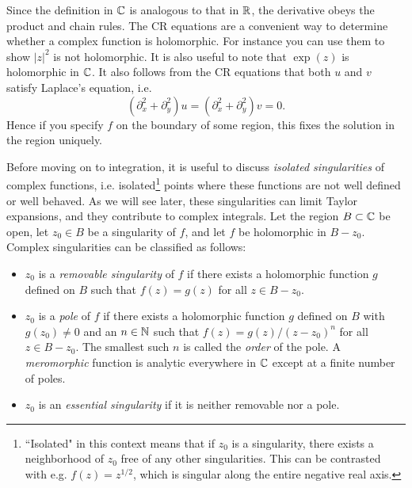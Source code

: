 Since the definition in $\mathbb{C}$ is analogous to that in $\mathbb{R}$, the derivative obeys
the product and chain rules. The CR equations are a convenient way
to determine whether a complex function is holomorphic. For instance you can
use them to show $|z|^2$ is not holomorphic. 
It is also useful to note that $\exp(z)$ is holomorphic in $\mathbb{C}$.
It also follows from the CR equations that both $u$ and $v$ satisfy
Laplace's equation, i.e.
\begin{equation}
\left(\partial_x^2+ \partial_y^2\right)u = \left(\partial_x^2
+\partial_y^2\right)v = 0.
\end{equation}
Hence if you specify $f$ on the boundary of some region, this fixes the solution
in the region uniquely.

Before moving on to integration, it is useful to discuss {\it isolated singularities} of
complex functions, i.e. isolated\footnote{``Isolated" in this context means that if
$z_0$ is a singularity, there exists a neighborhood of $z_0$ free of any other
singularities. This can be contrasted with e.g. $f(z)=z^{1/2}$, which is
singular along the entire negative real axis.} 
points where these functions are not well defined
or well behaved. As we will see later, these singularities can limit Taylor
expansions, and they contribute to complex integrals. 
Let the region $B\subset\mathbb{C}$ be open, let $z_0\in B$ be a singularity of $f$, 
and let $f$ be holomorphic in $B-z_0$. Complex singularities
can be classified as follows:
\begin{itemize}
  \item $z_0$ is a {\it removable singularity} of $f$ if there exists a
        holomorphic function $g$ defined on $B$ such that $f(z) = g(z)$ for all
        $z\in B-z_0$.  
  \item $z_0$ is a {\it pole} of $f$ if there exists a holomorphic function $g$
        defined on $B$ with $g(z_0)\neq0$ and an $n\in\mathbb{N}$ such that 
        $f(z) = g(z) / (z-z_0)^n$ for all $z\in B-z_0$. The smallest such $n$ 
        is called the {\it order} of the pole. A {\it meromorphic} function
         is analytic everywhere in $\mathbb{C}$ except at a finite
        number of poles.
  \item $z_0$ is an {\it essential singularity} if it is neither removable nor a
        pole.
\end{itemize}

